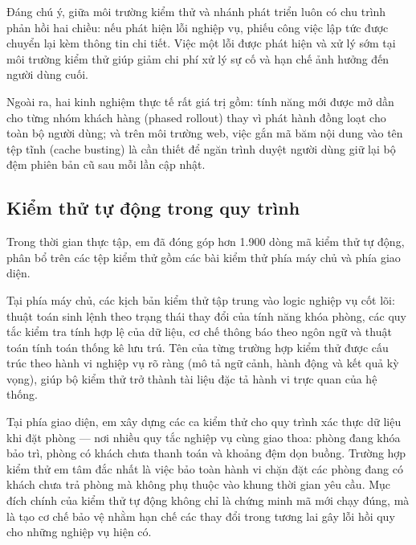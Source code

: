 Đáng chú ý, giữa môi trường kiểm thử và nhánh phát triển luôn có chu trình phản hồi hai chiều: nếu phát hiện lỗi nghiệp vụ, phiếu công việc lập tức được chuyển lại kèm thông tin chi tiết. Việc một lỗi được phát hiện và xử lý sớm tại môi trường kiểm thử giúp giảm chi phí xử lý sự cố và hạn chế ảnh hưởng đến người dùng cuối.

Ngoài ra, hai kinh nghiệm thực tế rất giá trị gồm: tính năng mới được mở dần cho từng nhóm khách hàng (phased rollout) thay vì phát hành đồng loạt cho toàn bộ người dùng; và trên môi trường web, việc gắn mã băm nội dung vào tên tệp tĩnh (cache busting) là cần thiết để ngăn trình duyệt người dùng giữ lại bộ đệm phiên bản cũ sau mỗi lần cập nhật.

\subsection{Kiểm thử tự động trong quy trình}

Trong thời gian thực tập, em đã đóng góp hơn 1.900 dòng mã kiểm thử tự động, phân bổ trên các tệp kiểm thử gồm các bài kiểm thử phía máy chủ và phía giao diện.

Tại phía máy chủ, các kịch bản kiểm thử tập trung vào logic nghiệp vụ cốt lõi: thuật toán sinh lệnh theo trạng thái thay đổi của tính năng khóa phòng, các quy tắc kiểm tra tính hợp lệ của dữ liệu, cơ chế thông báo theo ngôn ngữ và thuật toán tính toán thống kê lưu trú. Tên của từng trường hợp kiểm thử được cấu trúc theo hành vi nghiệp vụ rõ ràng (mô tả ngữ cảnh, hành động và kết quả kỳ vọng), giúp bộ kiểm thử trở thành tài liệu đặc tả hành vi trực quan của hệ thống.

Tại phía giao diện, em xây dựng các ca kiểm thử cho quy trình xác thực dữ liệu khi đặt phòng --- nơi nhiều quy tắc nghiệp vụ cùng giao thoa: phòng đang khóa bảo trì, phòng có khách chưa thanh toán và khoảng đệm dọn buồng. Trường hợp kiểm thử em tâm đắc nhất là việc bảo toàn hành vi chặn đặt các phòng đang có khách chưa trả phòng mà không phụ thuộc vào khung thời gian yêu cầu. Mục đích chính của kiểm thử tự động không chỉ là chứng minh mã mới chạy đúng, mà là tạo cơ chế bảo vệ nhằm hạn chế các thay đổi trong tương lai gây lỗi hồi quy cho những nghiệp vụ hiện có.

